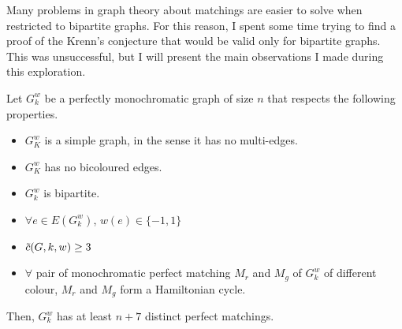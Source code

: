 Many problems in graph theory about matchings are easier to solve when restricted to bipartite graphs.
For this reason, I spent some time trying to find a proof of the Krenn's conjecture that would be valid only for bipartite graphs.
This was unsuccessful, but I will present the main observations I made during this exploration.

\begin{observation}
    \label{obs:bipartite_graphs}
    Let $G_k^w$ be a perfectly monochromatic graph of size $n$ that respects the following properties.
    \begin{itemize}
        \item $G_K^w$ is a simple graph, in the sense it has no multi-edges.
        \item $G_K^w$ has no bicoloured edges.
        \item $G_k^w$ is bipartite.
        \item $\forall e \in E(G_k^w)$, $w(e) \in \{-1, 1\}$
        \item $\Tilde{c}(G, k, w) \geq 3$
        \item $\forall$ pair of monochromatic perfect matching $M_r$ and $M_g$ of $G_k^w$ of different colour, $M_r$ and $M_g$ form a Hamiltonian cycle.
    \end{itemize}
    Then, $G_k^w$ has at least $n + 7$ distinct perfect matchings.   %
\end{observation}

